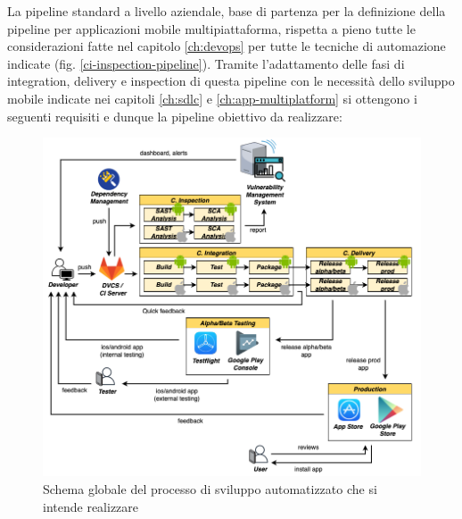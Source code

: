 La pipeline standard a livello aziendale, base di partenza per la definizione della pipeline per applicazioni mobile multipiattaforma, rispetta a pieno tutte le considerazioni fatte nel capitolo \ref{ch:devops} per tutte le tecniche di automazione indicate (fig. \ref{ci-inspection-pipeline}). Tramite l'adattamento delle fasi di integration, delivery e inspection di questa pipeline con le necessità dello sviluppo mobile indicate nei capitoli \ref{ch:sdlc} e \ref{ch:app-multiplatform} si ottengono i seguenti requisiti e dunque la pipeline obiettivo da realizzare:

\begin{figure}[H]
    \includegraphics[width=1\textwidth]{img/full-cicd.png}
    \caption{Schema globale del processo di sviluppo automatizzato che si intende realizzare}
    \label{full-cicd}
\end{figure}

